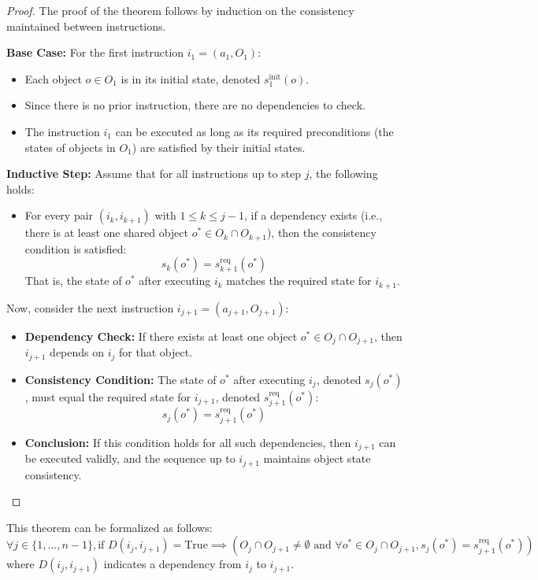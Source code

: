 \documentclass[a4paper,11pt]{lmcs}
\begin{document}
\begin{proof}
The proof of the theorem follows by induction on the consistency maintained between instructions.

\textbf{Base Case:} For the first instruction \(i_1 = (a_1, O_1)\):
\begin{itemize}
    \item Each object \(o \in O_1\) is in its initial state, denoted \(s_1^{\mathrm{init}}(o)\).
    \item Since there is no prior instruction, there are no dependencies to check.
    \item The instruction \(i_1\) can be executed as long as its required preconditions (the states of objects in \(O_1\)) are satisfied by their initial states.
\end{itemize}

\textbf{Inductive Step:} Assume that for all instructions up to step \(j\), the following holds:
\begin{itemize}
    \item For every pair \((i_k, i_{k+1})\) with \(1 \leq k \leq j-1\), if a dependency exists (i.e., there is at least one shared object \(o^* \in O_k \cap O_{k+1}\)), then the consistency condition is satisfied:
    \[
    s_k(o^*) = s_{k+1}^{\mathrm{req}}(o^*)
    \]
    That is, the state of \(o^*\) after executing \(i_k\) matches the required state for \(i_{k+1}\).
\end{itemize}

Now, consider the next instruction \(i_{j+1} = (a_{j+1}, O_{j+1})\):
\begin{itemize}
    \item \textbf{Dependency Check:} If there exists at least one object \(o^* \in O_j \cap O_{j+1}\), then \(i_{j+1}\) depends on \(i_j\) for that object.
    \item \textbf{Consistency Condition:} The state of \(o^*\) after executing \(i_j\), denoted \(s_j(o^*)\), must equal the required state for \(i_{j+1}\), denoted \(s_{j+1}^{\mathrm{req}}(o^*)\):
    \[
    s_j(o^*) = s_{j+1}^{\mathrm{req}}(o^*)
    \]
    \item \textbf{Conclusion:} If this condition holds for all such dependencies, then \(i_{j+1}\) can be executed validly, and the sequence up to \(i_{j+1}\) maintains object state consistency.
\end{itemize}
\end{proof}

This theorem can be formalized as follows:
\[
\forall j \in \{1, \ldots, n-1\}, \text{if } D(i_j, i_{j+1}) = \text{True} \implies \left( O_j \cap O_{j+1} \neq \emptyset \text{ and } \forall o^* \in O_j \cap O_{j+1}, s_j(o^*) = s_{j+1}^{\mathrm{req}}(o^*) \right)
\]
where \(D(i_j, i_{j+1})\) indicates a dependency from \(i_j\) to \(i_{j+1}\).
\end{document}
